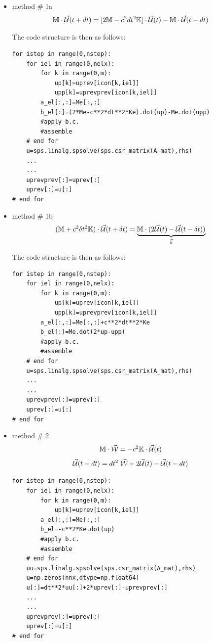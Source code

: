 \begin{itemize}
\item method \# 1a
\[
{\mathbb{M}} \cdot  \vec{\cal U}(t+dt)
= [2  {\mathbb{M}}  - c^2 dt^2 {\mathbb{K}}  ]  \cdot \vec{\cal U}(t) - {\mathbb{M}} \cdot \vec{\cal U}(t-dt)
\]

The code structure is then as follows:
\begin{lstlisting}
for istep in range(0,nstep):
    for iel in range(0,nelx):
        for k in range(0,m):
            up[k]=uprev[icon[k,iel]]
            upp[k]=uprevprev[icon[k,iel]]
        a_el[:,:]=Me[:,:]
        b_el[:]=(2*Me-c**2*dt**2*Ke).dot(up)-Me.dot(upp)
        #apply b.c.
        #assemble
    # end for
    u=sps.linalg.spsolve(sps.csr_matrix(A_mat),rhs)
    ...
    ...
    uprevprev[:]=uprev[:]
    uprev[:]=u[:]
# end for
\end{lstlisting}

\item method \# 1b
\[
({\mathbb{M}} + c^2 \delta t^2 {\mathbb{K}} ) \cdot \vec{\cal U}(t+\delta t) 
= \underbrace{ {\mathbb{M}} \cdot(2 \vec{\cal U}(t) - \vec{\cal U}(t-\delta t)) }_{\vec{b}}
\] 

The code structure is then as follows:
\begin{lstlisting}
for istep in range(0,nstep):
    for iel in range(0,nelx):
        for k in range(0,m):
            up[k]=uprev[icon[k,iel]]
            upp[k]=uprevprev[icon[k,iel]]
        a_el[:,:]=Me[:,:]+c**2*dt**2*Ke
        b_el[:]=Me.dot(2*up-upp)
        #apply b.c.
        #assemble
    # end for
    u=sps.linalg.spsolve(sps.csr_matrix(A_mat),rhs)
    ...
    ...
    uprevprev[:]=uprev[:]
    uprev[:]=u[:]
# end for
\end{lstlisting}

\item method \# 2 
\[
{\mathbb{M}} \cdot \vec{\cal W}= -c^2 {\mathbb{K}} \cdot \vec{\cal U}(t)
\]
\[
\vec{\cal U}(t+dt) = dt^2 \; \vec{\cal W} +2 \vec{\cal U}(t) - \vec{\cal U}(t-dt)
\]
\begin{lstlisting}
for istep in range(0,nstep):
    for iel in range(0,nelx):
        for k in range(0,m):
            up[k]=uprev[icon[k,iel]]
        a_el[:,:]=Me[:,:]
        b_el=-c**2*Ke.dot(up)
        #apply b.c.
        #assemble
    # end for
    uu=sps.linalg.spsolve(sps.csr_matrix(A_mat),rhs)
    u=np.zeros(nnx,dtype=np.float64)  
    u[:]=dt**2*uu[:]+2*uprev[:]-uprevprev[:]
    ...
    ...
    uprevprev[:]=uprev[:]
    uprev[:]=u[:]
# end for
\end{lstlisting}


\end{itemize}
